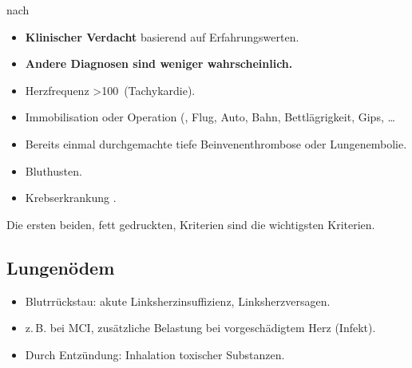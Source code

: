 {%
nach \cite{Wells2000}

\begin{itemize}
  \item {\bfseries Klinischer Verdacht} basierend auf
  Erfahrungswerten.
  \item {\bfseries Andere Diagnosen sind weniger
  wahrscheinlich.}
  \item Herzfrequenz \textgreater 100\,
  (Tachykardie).
  \item Immobilisation oder Operation  (, Flug, Auto,
  Bahn, Bettlägrigkeit, Gips, {\dots}
  \item Bereits einmal durchgemachte tiefe
  Beinvenenthrombose oder Lungenembolie.
  \item Bluthusten.
  \item Krebserkrankung .
\end{itemize}

Die ersten beiden, fett gedruckten, Kriterien sind die
wichtigsten Kriterien. 
}{

}{}{}{}




\subsection{Lungenödem}\label{topic:lungenoedem}

\nopagebreak

{%
\begin{itemize}
  \item Blutrrückstau: akute Linksherzinsuffizienz,
  Linksherzversagen.
  \item z.\,B. bei MCI, zusätzliche Belastung bei vorgeschädigtem Herz
  (Infekt).
  \item Durch Entzündung: Inhalation toxischer Substanzen.
\end{itemize}
}{

}{}{}{}



